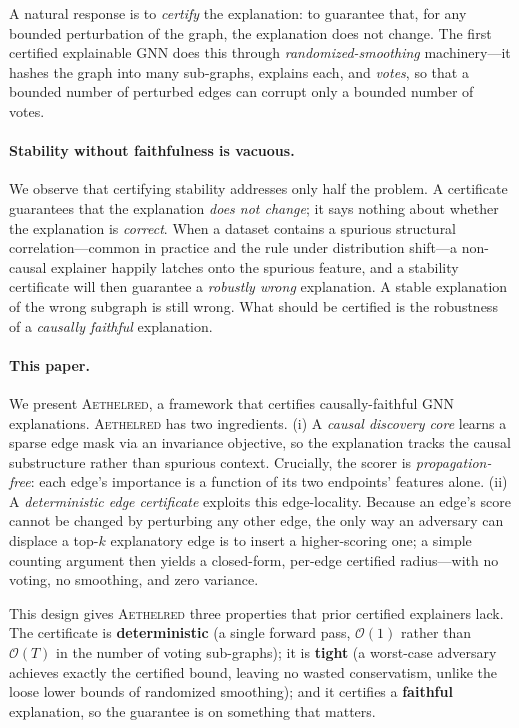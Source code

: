 \documentclass[letterpaper]{article}
\newcommand{\aeth}{\textsc{Aethelred}}
\newcommand{\win}[1]{\textcolor{wingreen}{\textbf{#1}}}
\newcommand{\bigO}{\mathcal{O}}
\begin{document}
A natural response is to \emph{certify} the explanation: to guarantee that, for
any bounded perturbation of the graph, the explanation does not change. The
first certified explainable GNN does this through \emph{randomized-smoothing}
machinery---it hashes the graph into many sub-graphs, explains each, and
\emph{votes}, so that a bounded number of perturbed edges can corrupt only a
bounded number of votes.

\paragraph{Stability without faithfulness is vacuous.}
We observe that certifying stability addresses only half the problem. A
certificate guarantees that the explanation \emph{does not change}; it says
nothing about whether the explanation is \emph{correct}. When a dataset contains
a spurious structural correlation---common in practice and the rule under
distribution shift---a non-causal explainer happily latches onto the spurious
feature, and a stability certificate will then guarantee a \emph{robustly wrong}
explanation. A stable explanation of the wrong subgraph is still wrong. What
should be certified is the robustness of a \emph{causally faithful}
explanation.

\paragraph{This paper.}
We present \aeth{}, a framework that certifies causally-faithful GNN
explanations. \aeth{} has two ingredients. (i) A \emph{causal discovery core}
learns a sparse edge mask via an invariance objective, so the explanation tracks
the causal substructure rather than spurious context. Crucially, the scorer is
\emph{propagation-free}: each edge's importance is a function of its two
endpoints' features alone. (ii) A \emph{deterministic edge certificate} exploits
this edge-locality. Because an edge's score cannot be changed by perturbing any
other edge, the only way an adversary can displace a top-$k$ explanatory edge is
to insert a higher-scoring one; a simple counting argument then yields a
closed-form, per-edge certified radius---with no voting, no smoothing, and zero
variance.

This design gives \aeth{} three properties that prior certified explainers lack.
The certificate is \win{deterministic} (a single forward pass, $\bigO(1)$ rather
than $\bigO(T)$ in the number of voting sub-graphs); it is \win{tight} (a
worst-case adversary achieves exactly the certified bound, leaving no wasted
conservatism, unlike the loose lower bounds of randomized smoothing); and it
certifies a \win{faithful} explanation, so the guarantee is on something that
matters.
\end{document}

